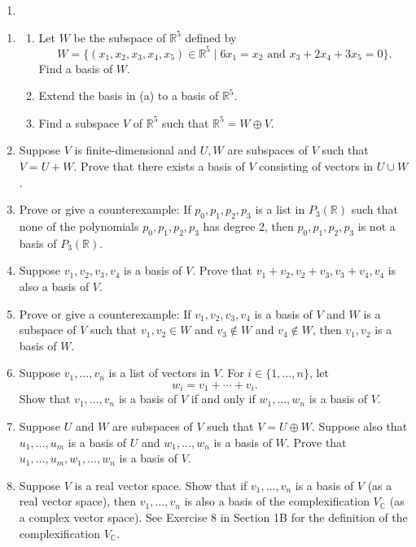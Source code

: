 \documentclass[
]{book}
\providecommand{\tightlist}{%
  \setlength{\itemsep}{0pt}\setlength{\parskip}{0pt}}
\theoremstyle{definition}
\theoremstyle{definition}
\theoremstyle{definition}
\theoremstyle{definition}
\theoremstyle{remark}
\begin{document}
\begin{enumerate}
\def\labelenumi{\alph{enumi}.}
\setcounter{enumi}{2}
\tightlist
\item
\end{enumerate}

\begin{enumerate}
\def\labelenumi{\arabic{enumi}.}
\setcounter{enumi}{3}
\item
  \begin{enumerate}
  \def\labelenumii{(\alph{enumii})}
  \item
    Let \(W\) be the subspace of \(\mathbb{R}^5\) defined by
    \[W = \{(x_1, x_2, x_3, x_4, x_5) \in \mathbb{R}^5 \mid 6x_1 = x_2 \text{ and } x_3 + 2x_4 + 3x_5 = 0\}.\]
    Find a basis of \(W\).
  \item
    Extend the basis in (a) to a basis of \(\mathbb{R}^5\).
  \item
    Find a subspace \(V\) of \(\mathbb{R}^5\) such that \(\mathbb{R}^5 = W \oplus V\).
  \end{enumerate}
\item
  Suppose \(V\) is finite-dimensional and \(U, W\) are subspaces of \(V\) such that \(V = U + W\). Prove that there exists a basis of \(V\) consisting of vectors in \(U \cup W\).
\item
  Prove or give a counterexample: If \(p_0, p_1, p_2, p_3\) is a list in \(P_3(\mathbb{R})\) such that none of the polynomials \(p_0, p_1, p_2, p_3\) has degree 2, then \(p_0, p_1, p_2, p_3\) is not a basis of \(P_3(\mathbb{R})\).
\item
  Suppose \(v_1, v_2, v_3, v_4\) is a basis of \(V\). Prove that \(v_1 + v_2, v_2 + v_3, v_3 + v_4, v_4\) is also a basis of \(V\).
\item
  Prove or give a counterexample: If \(v_1, v_2, v_3, v_4\) is a basis of \(V\) and \(W\) is a subspace of \(V\) such that \(v_1, v_2 \in W\) and \(v_3 \notin W\) and \(v_4 \notin W\), then \(v_1, v_2\) is a basis of \(W\).
\item
  Suppose \(v_1, \ldots, v_n\) is a list of vectors in \(V\). For \(i \in \{1, \ldots, n\}\), let
  \[w_i = v_1 + \cdots + v_i.\]
  Show that \(v_1, \ldots, v_n\) is a basis of \(V\) if and only if \(w_1, \ldots, w_n\) is a basis of \(V\).
\item
  Suppose \(U\) and \(W\) are subspaces of \(V\) such that \(V = U \oplus W\). Suppose also that \(u_1, \ldots, u_m\) is a basis of \(U\) and \(w_1, \ldots, w_n\) is a basis of \(W\). Prove that \(u_1, \ldots, u_m, w_1, \ldots, w_n\) is a basis of \(V\).
\item
  Suppose \(V\) is a real vector space. Show that if \(v_1, \ldots, v_n\) is a basis of \(V\) (as a real vector space), then \(v_1, \ldots, v_n\) is also a basis of the complexification \(V_{\mathbb{C}}\) (as a complex vector space).
  See Exercise 8 in Section 1B for the definition of the complexification \(V_{\mathbb{C}}\).
\end{enumerate}
\end{document}
